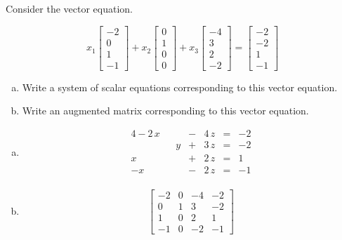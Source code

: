
\begin{exerciseStatement}


Consider the vector equation.

\[ x_{1} \left[\begin{array}{c}
-2 \\
0 \\
1 \\
-1
\end{array}\right] + x_{2} \left[\begin{array}{c}
0 \\
1 \\
0 \\
0
\end{array}\right] + x_{3} \left[\begin{array}{c}
-4 \\
3 \\
2 \\
-2
\end{array}\right] = \left[\begin{array}{c}
-2 \\
-2 \\
1 \\
-1
\end{array}\right] \]
\begin{enumerate}[(a)]
\item  Write a system of scalar equations corresponding to this vector equation. 
\item  Write an augmented matrix corresponding to this vector equation. 
\end{enumerate}
    
\end{exerciseStatement}
    
\begin{exerciseAnswer} 

\begin{enumerate}[(a)]
\item 
\begin{alignat*}{4} -2 \, x & &  &-& 4 \, z &=& -2 \\ & & y &+& 3 \, z &=& -2 \\x & &  &+& 2 \, z &=& 1 \\-x & &  &-& 2 \, z &=& -1 \\ \end{alignat*}
            
\item \[ \left[\begin{array}{ccc|c}
-2 & 0 & -4 & -2 \\
0 & 1 & 3 & -2 \\
1 & 0 & 2 & 1 \\
-1 & 0 & -2 & -1
\end{array}\right] \]
\end{enumerate}
    
\end{exerciseAnswer}
    
